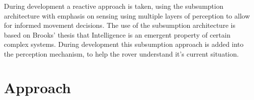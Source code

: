\documentclass[a4paper,12pt,twocolumn]{report}
\begin{document}
During development a reactive approach is taken, using the subsumption architecture \citep{wooldridge2009introduction} with emphasis on sensing using multiple layers of perception to allow for informed movement decisions. The use of the subsumption architecture is based on Brooks' thesis that Intelligence is an emergent property of certain complex systems. \citep{brooks1991intelligence} During development this subsumption approach is added into the perception mechanism, to help the rover understand it's current situation.

\section{Approach}




\end{document}
